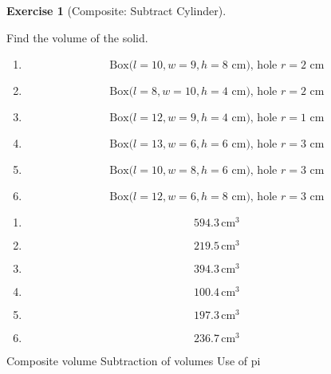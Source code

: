 \documentclass[
  letterpaper,
  DIV=11,
  numbers=noendperiod]{scrreprt}
\theoremstyle{definition}
\newtheorem{exercise}{Exercise}[chapter]
\theoremstyle{remark}
\begin{document}
\begin{exercise}[Composite: Subtract
Cylinder]\protect\hypertarget{exr-comp-4}{}\label{exr-comp-4}

Find the volume of the solid.

\begin{enumerate}
\def\labelenumi{\alph{enumi})}
\item
  \[\text{Box}(l=10,w=9,h=8\text{ cm)}\text{, hole }r=2\text{ cm}\]
\item
  \[\text{Box}(l=8,w=10,h=4\text{ cm)}\text{, hole }r=2\text{ cm}\]
\item
  \[\text{Box}(l=12,w=9,h=4\text{ cm)}\text{, hole }r=1\text{ cm}\]
\item
  \[\text{Box}(l=13,w=6,h=6\text{ cm)}\text{, hole }r=3\text{ cm}\]
\item
  \[\text{Box}(l=10,w=8,h=6\text{ cm)}\text{, hole }r=3\text{ cm}\]
\item
  \[\text{Box}(l=12,w=6,h=8\text{ cm)}\text{, hole }r=3\text{ cm}\]
\end{enumerate}

\begin{tcolorbox}[enhanced jigsaw, opacitybacktitle=0.6, coltitle=black, arc=.35mm, colframe=quarto-callout-tip-color-frame, colback=white, bottomrule=.15mm, left=2mm, colbacktitle=quarto-callout-tip-color!10!white, titlerule=0mm, opacityback=0, title=\textcolor{quarto-callout-tip-color}{\faLightbulb}\hspace{0.5em}{🔍 View Solution}, leftrule=.75mm, breakable, rightrule=.15mm, bottomtitle=1mm, toptitle=1mm, toprule=.15mm]

\begin{enumerate}
\def\labelenumi{\alph{enumi})}
\item
  \[594.3\,\text{cm}^{3}\]
\item
  \[219.5\,\text{cm}^{3}\]
\item
  \[394.3\,\text{cm}^{3}\]
\item
  \[100.4\,\text{cm}^{3}\]
\item
  \[197.3\,\text{cm}^{3}\]
\item
  \[236.7\,\text{cm}^{3}\]
\end{enumerate}

\end{tcolorbox}

{Composite volume} {Subtraction of volumes} {Use of pi}

\end{exercise}
\end{document}

